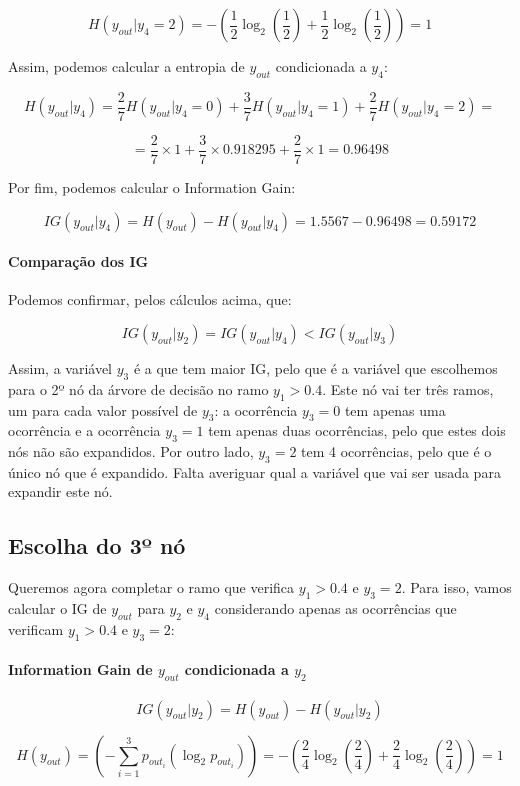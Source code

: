 \documentclass{article}
\begin{document}
\[ H(y_{out}|y_4 = 2) = - \left( \frac{1}{2} \log_2 \left( \frac{1}{2} \right) + \frac{1}{2} \log_2 \left( \frac{1}{2} \right) \right) = 1 \]

Assim, podemos calcular a entropia de $y_{out}$ condicionada a $y_4$:

\[ H(y_{out}|y_4) = \frac{2}{7} H(y_{out}|y_4 = 0) + \frac{3}{7} H(y_{out}|y_4 = 1) + \frac{2}{7} H(y_{out}|y_4 = 2) = \]

\[ = \frac{2}{7} \times 1 + \frac{3}{7} \times 0.918295 + \frac{2}{7} \times 1 = 0.96498 \]

Por fim, podemos calcular o Information Gain:

\[ IG(y_{out}|y_4) = H(y_{out}) - H(y_{out}|y_4) = 1.5567 - 0.96498 = 0.59172 \]

\paragraph{Comparação dos IG}

Podemos confirmar, pelos cálculos acima, que:

\[ IG(y_{out}|y_2) = IG(y_{out}|y_4) < IG(y_{out}|y_3) \]

Assim, a variável $y_3$ é a que tem maior IG, pelo que é a variável que escolhemos para o 2º nó da árvore de decisão no ramo $y_1>0.4$.
Este nó vai ter três ramos, um para cada valor possível de $y_3$: a ocorrência $y_3=0$ tem apenas uma ocorrência e a ocorrência $y_3=1$ tem apenas duas ocorrências, pelo que estes dois nós não são expandidos.
Por outro lado, $y_3=2$ tem 4 ocorrências, pelo que é o único nó que é expandido. Falta averiguar qual a variável que vai ser usada para expandir este nó.

\subsection{Escolha do 3º nó}

Queremos agora completar o ramo que verifica $y_1 > 0.4$ e $y_3 = 2$. Para isso, vamos calcular o IG de $y_{out}$ para $y_2$ e $y_4$ considerando apenas as ocorrências que verificam $y_1 > 0.4$ e $y_3 = 2$:

\paragraph{Information Gain de $y_{out}$ condicionada a $y_2$}

\[ IG(y_{out}|y_2) = H(y_{out}) - H(y_{out}|y_2) \]

\[ H(y_{out}) = \left(- \sum_{i=1}^{3} p_{out_i} (\log_2 p_{out_i})\right) = - \left( \frac{2}{4} \log_2 \left( \frac{2}{4} \right) + \frac{2}{4} \log_2 \left( \frac{2}{4} \right) \right) = 1 \]
\end{document}
